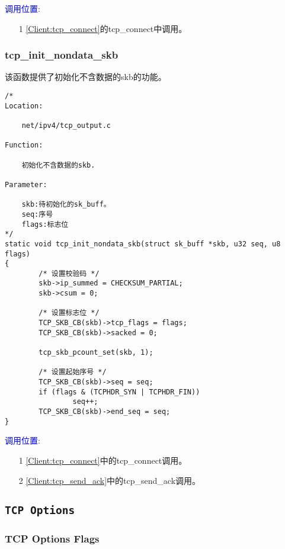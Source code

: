 		\textcolor{blue}{调用位置}:

			\begin{enumerate}
			\item[1]		\ref{Client:tcp_connect}的tcp\_connect中调用。
			\end{enumerate}
		\subsubsection{tcp\_init\_nondata\_skb}
			\label{TCPInitialize:tcp_init_nondata_skb}
			该函数提供了初始化不含数据的skb的功能。
\begin{verbatim}
/*
Location:

    net/ipv4/tcp_output.c
    
Function:

    初始化不含数据的skb.

Parameter:

    skb:待初始化的sk_buff。
    seq:序号
    flags:标志位
*/
static void tcp_init_nondata_skb(struct sk_buff *skb, u32 seq, u8 flags)
{
        /* 设置校验码 */
        skb->ip_summed = CHECKSUM_PARTIAL;
        skb->csum = 0;

        /* 设置标志位 */
        TCP_SKB_CB(skb)->tcp_flags = flags;
        TCP_SKB_CB(skb)->sacked = 0;

        tcp_skb_pcount_set(skb, 1);

        /* 设置起始序号 */
        TCP_SKB_CB(skb)->seq = seq;
        if (flags & (TCPHDR_SYN | TCPHDR_FIN))
                seq++;
        TCP_SKB_CB(skb)->end_seq = seq;
}
\end{verbatim}

		\textcolor{blue}{调用位置}:

			\begin{enumerate}
				\item[1]		\ref{Client:tcp_connect}中的tcp\_connect调用。
				\item[2]		\ref{Client:tcp_send_ack}中的tcp\_send\_ack调用。
			\end{enumerate}

	\subsection{\texttt{TCP Options}}
		\subsubsection{TCP Options Flags}

